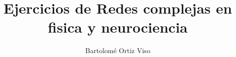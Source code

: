 \documentclass[a4paper,12pt,twoside]{report}
\begin{document}
	


\title{\LARGE {\bf Ejercicios de Redes complejas en fisica y neurociencia}\\
 \vspace*{6mm}
}

\author{Bartolomé Ortiz Viso}

\narrowlinespacing
\maketitle

\preface



\body







\appendix




\end{document}
